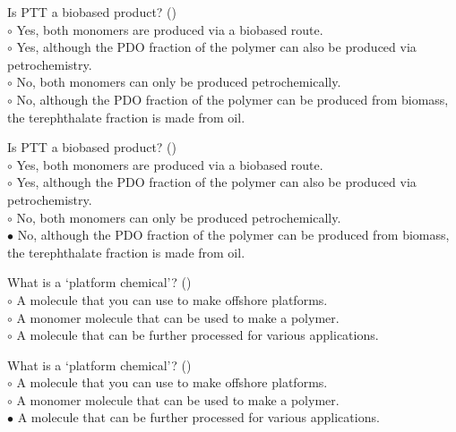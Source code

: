 \documentclass[]{beamer}
\begin{document}
\begin{CJK}{UTF8}{gbsn}
\begin{frame}[shrink] {}
\addtocounter{questions}{1}
\color{blue}
Is PTT a biobased product?
({})\\
\color{black}
\setlength{\parindent}{-0.4cm}
{\color{red}$\circ$} Yes, both monomers are produced via a biobased route.  \\
{\color{red}$\circ$} Yes, although the PDO fraction of the polymer can also be produced via petrochemistry.   \\
{\color{red}$\circ$} No, both monomers can only be produced petrochemically.   \\
{\color{red}$\circ$}  No, although the PDO fraction of the polymer can be produced from biomass, the terephthalate fraction is made from oil.   \\
\end{frame}
\begin{frame}[shrink] {}
\addtocounter{answers}{1}
\color{blue}
Is PTT a biobased product?
({})\\
\color{black}
\setlength{\parindent}{-0.4cm}
{\color{red}$\circ$} Yes, both monomers are produced via a biobased route.  \\
{\color{red}$\circ$} Yes, although the PDO fraction of the polymer can also be produced via petrochemistry.   \\
{\color{red}$\circ$} No, both monomers can only be produced petrochemically.   \\
{\color{red}$\bullet$} No, although the PDO fraction of the polymer can be produced from biomass, the terephthalate fraction is made from oil.   \\
\end{frame}


\begin{frame}[shrink] {}
\addtocounter{questions}{1}
\color{blue}
What is a ‘platform chemical’?
({})\\
\color{black}
\setlength{\parindent}{-0.4cm}
{\color{red}$\circ$} A molecule that you can use to make offshore platforms.  \\
{\color{red}$\circ$} A monomer molecule that can be used to make a polymer.   \\
{\color{red}$\circ$}  A molecule that can be further processed for various applications.  \\
\end{frame}
\begin{frame}[shrink] {}
\addtocounter{answers}{1}
\color{blue}
What is a ‘platform chemical’?
({})\\
\color{black}
\setlength{\parindent}{-0.4cm}
{\color{red}$\circ$} A molecule that you can use to make offshore platforms.  \\
{\color{red}$\circ$} A monomer molecule that can be used to make a polymer.   \\
{\color{red}$\bullet$} A molecule that can be further processed for various applications.  \\
\end{frame}



\end{CJK}
\end{document}

